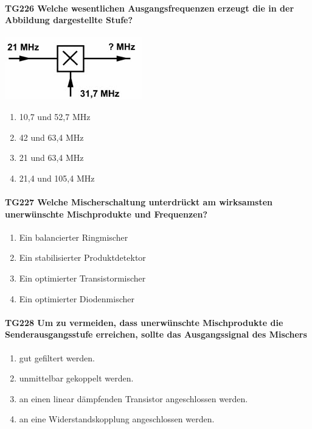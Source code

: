 \documentclass[8pt]{article}
\begin{document}
\paragraph*{TG226 Welche wesentlichen Ausgangsfrequenzen erzeugt die in der Abbildung dargestellte Stufe?}
\begin{center}
	\begin{minipage}{\linewidth}
		\centering
		\includegraphics[scale=1.0]{pics/tg226_a.jpg}
	\end{minipage}
\end{center}
\begin{enumerate}[nolistsep,label=\Alph*]
\item 10,7 und 52,7 MHz
\item 42 und 63,4 MHz
\item 21 und 63,4 MHz
\item 21,4 und 105,4 MHz
\end{enumerate}

\paragraph*{TG227 Welche Mischerschaltung unterdrückt am wirksamsten unerwünschte Mischprodukte und Frequenzen?}
\begin{enumerate}[nolistsep,label=\Alph*]
\item Ein balancierter Ringmischer
\item Ein stabilisierter Produktdetektor
\item Ein optimierter Transistormischer
\item Ein optimierter Diodenmischer
\end{enumerate}

\paragraph*{TG228 Um zu vermeiden, dass unerwünschte Mischprodukte die Senderausgangsstufe erreichen, sollte das Ausgangssignal des Mischers}
\begin{enumerate}[nolistsep,label=\Alph*]
\item gut gefiltert werden.
\item unmittelbar gekoppelt werden.
\item an einen linear dämpfenden Transistor angeschlossen werden.
\item an eine Widerstandskopplung angeschlossen werden.
\end{enumerate}
\end{document}
